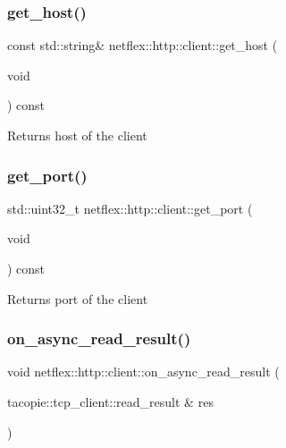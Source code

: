 \subsubsection{\texorpdfstring{get\+\_\+host()}{get\_host()}}
{\footnotesize\ttfamily const std\+::string\& netflex\+::http\+::client\+::get\+\_\+host (\begin{DoxyParamCaption}\item[{void}]{ }\end{DoxyParamCaption}) const}

\begin{DoxyReturn}{Returns}
host of the client 
\end{DoxyReturn}
\mbox{\label{classnetflex_1_1http_1_1client_a9d64406a2b36fa59610798ee9abcf735}} 
\subsubsection{\texorpdfstring{get\+\_\+port()}{get\_port()}}
{\footnotesize\ttfamily std\+::uint32\+\_\+t netflex\+::http\+::client\+::get\+\_\+port (\begin{DoxyParamCaption}\item[{void}]{ }\end{DoxyParamCaption}) const}

\begin{DoxyReturn}{Returns}
port of the client 
\end{DoxyReturn}
\mbox{\label{classnetflex_1_1http_1_1client_ae9fbf1637c4faf451cc9f27148a9498a}} 
\subsubsection{\texorpdfstring{on\+\_\+async\+\_\+read\+\_\+result()}{on\_async\_read\_result()}}
{\footnotesize\ttfamily void netflex\+::http\+::client\+::on\+\_\+async\+\_\+read\+\_\+result (\begin{DoxyParamCaption}\item[{tacopie\+::tcp\+\_\+client\+::read\+\_\+result \&}]{res }\end{DoxyParamCaption})}

